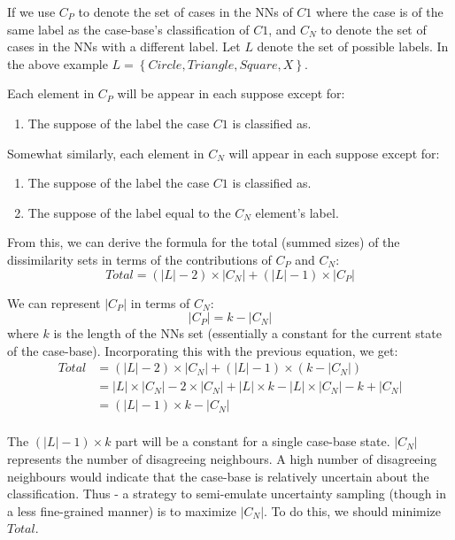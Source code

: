 \documentclass[a4paper,11pt]{report}
\begin{document}
\vspace{10pt}

If we use $C_{P}$ to denote the set of cases in the NNs of $C1$ where the case is of the same label as the case-base's classification of $C1$, and $C_{N}$ to denote the set of cases in the NNs with a different label. Let $L$ denote the set of possible labels. In the above example $L=\left\lbrace Circle, Triangle, Square, X\right\rbrace$.

Each element in $C_{P}$ will be appear in each suppose except for:
\begin{enumerate}
	\item The suppose of the label the case $C1$ is classified as.
\end{enumerate}

Somewhat similarly, each element in $C_{N}$ will appear in each suppose except for:
\begin{enumerate}
	\item The suppose of the label the case $C1$ is classified as.
	\item The suppose of the label equal to the $C_{N}$ element's label.
\end{enumerate}

From this, we can derive the formula for the total (summed sizes) of the dissimilarity sets in terms of the contributions of $C_{P}$ and $C_{N}$:
\[ Total= (|L| - 2)\times |C_{N}| +(|L| - 1)\times |C_{P}|  \] 

We can represent $|C_{P}|$ in terms of $C_{N}$:
\[ |C_{P}| = k -  |C_{N}| \]
where $k$ is the length of the NNs set (essentially a constant for the current state of the case-base). Incorporating this with the previous equation, we get:
\begin{align*}
Total &= (|L| - 2)\times |C_{N}| +(|L| - 1)\times (k - |C_{N}|) \\
&= |L| \times |C_{N}| - 2\times|C_{N}| + |L|\times k - |L| \times |C_{N}| - k + |C_{N}| \\
&= (|L| - 1) \times k - |C_{N}| \\
\end{align*} 

The $ (|L| - 1) \times k $ part will be a constant for a single case-base state. $|C_{N}|$ represents the number of disagreeing neighbours. A high number of disagreeing neighbours would indicate that the case-base is relatively uncertain about the classification. Thus - a strategy to semi-emulate uncertainty sampling (though in a less fine-grained manner) is to maximize $|C_{N}|$. To do this, we should minimize $Total$.
\end{document}
